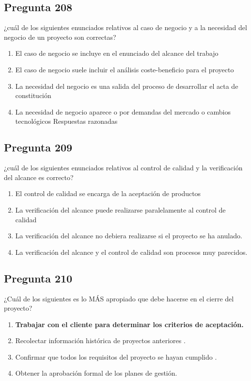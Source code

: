 \documentclass[11pt,a4paper]{article}
\begin{document}
\subsection*{Pregunta 208}
¿cuál de los siguientes enunciados relativos al caso de negocio y a la necesidad del negocio de un proyecto son correctas?

\begin{enumerate}[label=\alph*)]
  \item El caso de negocio se incluye en el enunciado del alcance del trabajo
  \item El caso de negocio suele incluir el análisis coste-beneficio para el proyecto
  \item La necesidad del negocio es una salida del proceso de desarrollar el acta de constitución
  \item La necesidad de negocio aparece o por demandas del mercado o cambios tecnológicos Respuestas razonadas
\end{enumerate}

\subsection*{Pregunta 209}
¿cuál de los siguientes enunciados relativos al control de calidad y la verificación del alcance es correcto?

\begin{enumerate}[label=\alph*)]
  \item El control de calidad se encarga de la aceptación de productos
  \item La verificación del alcance puede realizarse paralelamente al control de calidad
  \item La verificación del alcance no debiera realizarse si el proyecto se ha anulado.
  \item La verificación del alcance y el control de calidad son procesos muy parecidos.
\end{enumerate}

\subsection*{Pregunta 210}
¿Cuál de los siguientes es lo MÁS apropiado que debe hacerse en el cierre del proyecto?

\begin{enumerate}[label=\alph*)]
  \item \textbf{Trabajar con el cliente para determinar los criterios de aceptación.}
  \item Recolectar información histórica de proyectos anteriores .
  \item Confirmar que todos los requisitos del proyecto se hayan cumplido .
  \item Obtener la aprobación formal de los planes de gestión.
\end{enumerate}
\end{document}
